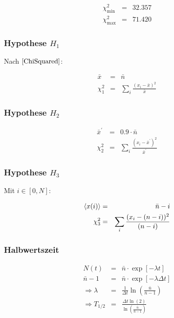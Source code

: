 \documentclass[12pt,a4paper]{scrartcl}
\numberwithin{equation}{section} %
\renewcommand{\[}{} %
\renewcommand{\]}{\noindent} %
\begin{document}
\[
\begin{eqnarray}
    \chi^2_\mathrm{min} &=& 32.357 \\
    \chi^2_\mathrm{max} &=& 71.420
\end{eqnarray}
\]

\hypertarget{hypothese-h_1}{%
\subsubsection{\texorpdfstring{Hypothese
\(H_1\)}{Hypothese H\_1}}\label{hypothese-h_1}}

Nach \(\eqref{ChiSquared}\):

\[
\begin{eqnarray}
    \bar x &=& \bar n \\
    \chi^2_1 &=& \sum_i \frac{(x_i-\bar x)^2}{\bar x}
\end{eqnarray}
\]

\hypertarget{hypothese-h_2}{%
\subsubsection{\texorpdfstring{Hypothese
\(H_2\)}{Hypothese H\_2}}\label{hypothese-h_2}}

\[
\begin{eqnarray}
    \bar x^\prime &=& 0.9\cdot\bar n \\
    \chi^2_2 &=& \sum_i \frac{(x_i-\bar x^\prime)^2}{\bar x^\prime}
\end{eqnarray}
\]

\hypertarget{hypothese-h_3}{%
\subsubsection{\texorpdfstring{Hypothese
\(H_3\)}{Hypothese H\_3}}\label{hypothese-h_3}}

Mit \(i\in[0, N]\):

\[
\begin{eqnarray}
    \expval{x(i)} &=& \bar n - i \\
    \chi^2_3 &=& \sum_i \frac{(x_i-(n - i))^2}{(n - i)}
\end{eqnarray}
\]

\hypertarget{totzeit}{%
\subsubsection{Halbwertszeit}\label{totzeit}}
\begin{eqnarray}
	N(t) &=& \bar{n} \cdot \exp[-\lambda t] \\
	\bar{n}-1 &=& \bar{n} \cdot \exp[-\lambda \Delta t] \\
	\Rightarrow \lambda &=& \frac{1}{\Delta t} \ln(\frac{\bar{n}}{\bar{n}-1}) \\
	\Rightarrow T_{1/2} &=& \frac{\Delta t \ln(2)}{\ln(\frac{\bar{n}}{\bar{n}-1})}
\end{eqnarray}
\end{document}
